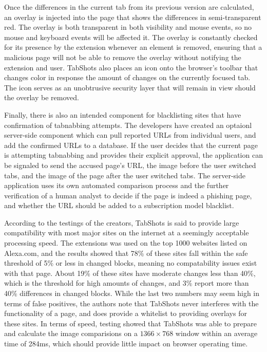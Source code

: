 \documentclass[12pt]{article}
\begin{document}
\begin{doublespace}
Once the differences in the current tab from its previous version are calculated, an overlay is injected into the page that shows the differences in semi-transparent red.  The overlay is both transparent in both visibility and mouse events, so no mouse and keyboard events will be affected it.  The overlay is constantly checked for its presence by the extension whenever an element is removed, ensuring that a malicious page will not be able to remove the overlay without notifying the extension and user.  TabShots also places an icon onto the browser's toolbar that changes color in response the amount of changes on the currently focused tab.  The icon serves as an unobtrusive security layer that will remain in view should the overlay be removed.

Finally, there is also an intended component for blacklisting sites that have confirmation of tabnabbing attempts.  The developers have created an optaionl server-side component which can pull reported URLs from individual users, and add the confirmed URLs to a database.  If the user decides that the current page is attempting tabnabbing and provides their explicit approval, the application can be signaled to send the accused page's URL, the image before the user switched tabs, and the image of the page after the user switched tabs.  The server-side application uses its own automated comparison process and the further verification of a human analyst to decide if the page is indeed a phishing page, and whether the URL should be added to a subscription model blacklist.  

According to the testings of the creators, TabShots is said to provide large compatibility with most major sites on the internet at a seemingly acceptable processing speed.  The extensions was used on the top 1000 websites listed on Alexa.com, and the results showed that 78\% of these sites fall within the safe threshold of 5\% or less in changed blocks, meaning no compatability issues exist with that page.  About 19\% of these sites have moderate changes less than 40\%, which is the threshold for high amounts of changes, and 3\% report more than 40\% differences in changed blocks.  While the last two numbers may seem high in terms of false positives, the authors note that TabShots never interferes with the functionality of a page, and does provide a whitelist to providing overlays for these sites.  In terms of speed, testing showed that TabShots was able to prepare and calculate the image comparisions on a $1366 \times 768$ window within an average time of 284ms, which should provide little impact on browser operating time.


\end{doublespace}
\end{document}
